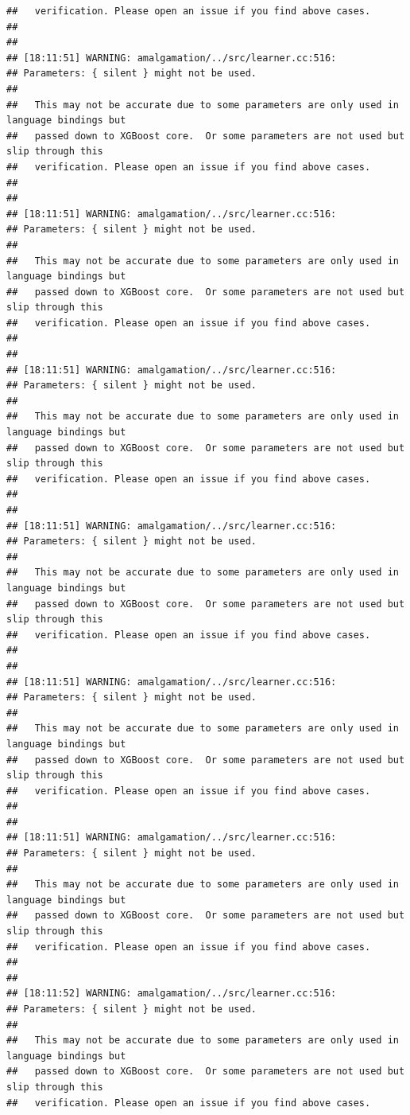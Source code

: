 \documentclass[AMS,STIX2COL]{WileyNJD-v2}\usepackage[]{graphicx}\usepackage[]{color}
\makeatletter
\newenvironment{kframe}{%
 \def\at@end@of@kframe{}%
 \ifinner\ifhmode%
  \def\at@end@of@kframe{\end{minipage}}%
  \begin{minipage}{\columnwidth}%
 \fi\fi%
 \def\FrameCommand##1{\hskip\@totalleftmargin \hskip-\fboxsep
 \colorbox{shadecolor}{##1}\hskip-\fboxsep
     \hskip-\linewidth \hskip-\@totalleftmargin \hskip\columnwidth}%
 \MakeFramed {\advance\hsize-\width
   \@totalleftmargin\z@ \linewidth\hsize
   \@setminipage}}%
 {\par\unskip\endMakeFramed%
 \at@end@of@kframe}
\newenvironment{knitrout}{}{} %
\makeatother
\begin{document}
\begin{knitrout}
\begin{kframe}
\begin{verbatim}
##   verification. Please open an issue if you find above cases.
## 
## 
## [18:11:51] WARNING: amalgamation/../src/learner.cc:516: 
## Parameters: { silent } might not be used.
## 
##   This may not be accurate due to some parameters are only used in language bindings but
##   passed down to XGBoost core.  Or some parameters are not used but slip through this
##   verification. Please open an issue if you find above cases.
## 
## 
## [18:11:51] WARNING: amalgamation/../src/learner.cc:516: 
## Parameters: { silent } might not be used.
## 
##   This may not be accurate due to some parameters are only used in language bindings but
##   passed down to XGBoost core.  Or some parameters are not used but slip through this
##   verification. Please open an issue if you find above cases.
## 
## 
## [18:11:51] WARNING: amalgamation/../src/learner.cc:516: 
## Parameters: { silent } might not be used.
## 
##   This may not be accurate due to some parameters are only used in language bindings but
##   passed down to XGBoost core.  Or some parameters are not used but slip through this
##   verification. Please open an issue if you find above cases.
## 
## 
## [18:11:51] WARNING: amalgamation/../src/learner.cc:516: 
## Parameters: { silent } might not be used.
## 
##   This may not be accurate due to some parameters are only used in language bindings but
##   passed down to XGBoost core.  Or some parameters are not used but slip through this
##   verification. Please open an issue if you find above cases.
## 
## 
## [18:11:51] WARNING: amalgamation/../src/learner.cc:516: 
## Parameters: { silent } might not be used.
## 
##   This may not be accurate due to some parameters are only used in language bindings but
##   passed down to XGBoost core.  Or some parameters are not used but slip through this
##   verification. Please open an issue if you find above cases.
## 
## 
## [18:11:51] WARNING: amalgamation/../src/learner.cc:516: 
## Parameters: { silent } might not be used.
## 
##   This may not be accurate due to some parameters are only used in language bindings but
##   passed down to XGBoost core.  Or some parameters are not used but slip through this
##   verification. Please open an issue if you find above cases.
## 
## 
## [18:11:52] WARNING: amalgamation/../src/learner.cc:516: 
## Parameters: { silent } might not be used.
## 
##   This may not be accurate due to some parameters are only used in language bindings but
##   passed down to XGBoost core.  Or some parameters are not used but slip through this
##   verification. Please open an issue if you find above cases.

\end{verbatim}
\end{kframe}
\end{knitrout}
\end{document}
